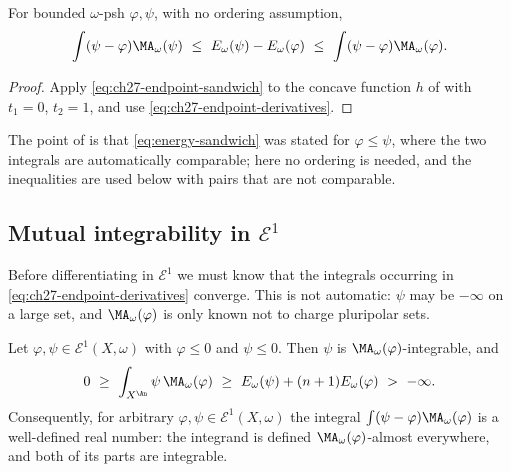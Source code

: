 \begin{corollary}
\label{cor:ch27-bounded-sandwich}
For bounded \(\omega\)-psh \(\varphi,\psi\), with no ordering assumption,
\begin{equation}\label{eq:ch27-bounded-two-sided}
 \int(\psi-\varphi)\MA_\omega(\psi)
 \ \leq\ E_\omega(\psi)-E_\omega(\varphi)
 \ \leq\ \int(\psi-\varphi)\MA_\omega(\varphi).
\end{equation}
\end{corollary}

\begin{proof}
Apply \eqref{eq:ch27-endpoint-sandwich} to the concave function \(h\) of
 with \(t_1=0\), \(t_2=1\), and use
\eqref{eq:ch27-endpoint-derivatives}.
\end{proof}

The point of  is that
\eqref{eq:energy-sandwich} was stated for \(\varphi\leq\psi\), where the two
integrals are automatically comparable; here no ordering is needed, and the
inequalities are used below with pairs that are not comparable.

\subsection{Mutual integrability in \texorpdfstring{\(\mathcal E^1\)}{E1}}
\label{sec:ch27-mutual-integrability}

Before differentiating in \(\mathcal E^1\) we must know that the integrals
occurring in \eqref{eq:ch27-endpoint-derivatives} converge.  This is not
automatic: \(\psi\) may be \(-\infty\) on a large set, and
\(\MA_\omega(\varphi)\) is only known not to charge pluripolar sets.

\begin{lemma}
\label{lem:ch27-mutual-integrability}
Let \(\varphi,\psi\in\mathcal E^1(X,\omega)\) with \(\varphi\leq0\) and
\(\psi\leq0\).  Then \(\psi\) is \(\MA_\omega(\varphi)\)-integrable, and
\begin{equation}\label{eq:ch27-mutual-integrability}
 0\ \geq\ \int_{X^{\An}}\psi\,\MA_\omega(\varphi)
   \ \geq\ E_\omega(\psi)+(n+1)E_\omega(\varphi)\ >\ -\infty .
\end{equation}
Consequently, for arbitrary \(\varphi,\psi\in\mathcal E^1(X,\omega)\) the
integral \(\int(\psi-\varphi)\MA_\omega(\varphi)\) is a well-defined real
number: the integrand is defined \(\MA_\omega(\varphi)\)-almost everywhere,
and both of its parts are integrable.
\end{lemma}

